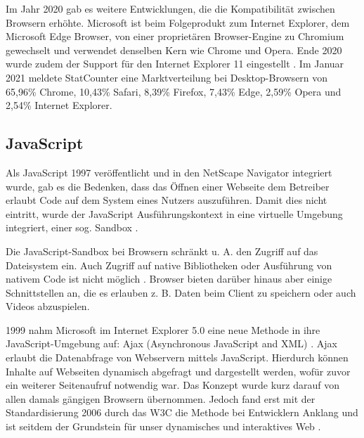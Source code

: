 Im Jahr 2020 gab es weitere Entwicklungen, die die Kompatibilität zwischen Browsern erhöhte. Microsoft ist beim Folgeprodukt zum Internet Explorer, dem Microsoft Edge Browser, von einer proprietären Browser-Engine zu Chromium gewechselt \cite{MicrosoftEdgeChromium} und verwendet denselben Kern wie Chrome und Opera. Ende 2020 wurde zudem der Support für den Internet Explorer 11 eingestellt \cite{MicrosoftInternetExplorerDeprecation}. Im Januar 2021 meldete StatCounter \cite{StatCounterBrowserMarketshare} eine Marktverteilung bei Desktop-Browsern von 65,96\% Chrome, 10,43\% Safari, 8,39\% Firefox, 7,43\% Edge, 2,59\% Opera und 2,54\% Internet Explorer.

\subsection{JavaScript}

Als JavaScript 1997 veröffentlicht und in den NetScape Navigator integriert wurde, gab es die Bedenken, dass das Öffnen einer Webseite dem Betreiber erlaubt Code auf dem System eines Nutzers auszuführen. Damit dies nicht eintritt, wurde der JavaScript Ausführungskontext in eine virtuelle Umgebung integriert, einer sog. Sandbox \cite{LearningJavaScript}.

Die JavaScript-Sandbox bei Browsern schränkt u. A. den Zugriff auf das Dateisystem ein. Auch Zugriff auf native Bibliotheken oder Ausführung von nativem Code ist nicht möglich \cite{TheSpyInTheSandbox}. Browser bieten darüber hinaus aber einige Schnittstellen an, die es erlauben z. B. Daten beim Client zu speichern oder auch Videos abzuspielen.


1999 nahm Microsoft im Internet Explorer 5.0 eine neue Methode in ihre JavaScript-Umgebung auf: Ajax (Asynchronous JavaScript and XML) \cite{MDNAjax}. Ajax erlaubt die Datenabfrage von Webservern mittels JavaScript. Hierdurch können Inhalte auf Webseiten dynamisch abgefragt und dargestellt werden, wofür zuvor ein weiterer Seitenaufruf notwendig war. Das Konzept wurde kurz darauf von allen damals gängigen Browsern übernommen. Jedoch fand erst mit der Standardisierung 2006 durch das W3C \cite{TheXMLHttpRequestObject} die Methode bei Entwicklern Anklang und ist seitdem der Grundstein für unser dynamisches und interaktives Web \cite{ResearchOnAJAXTechnology}.

